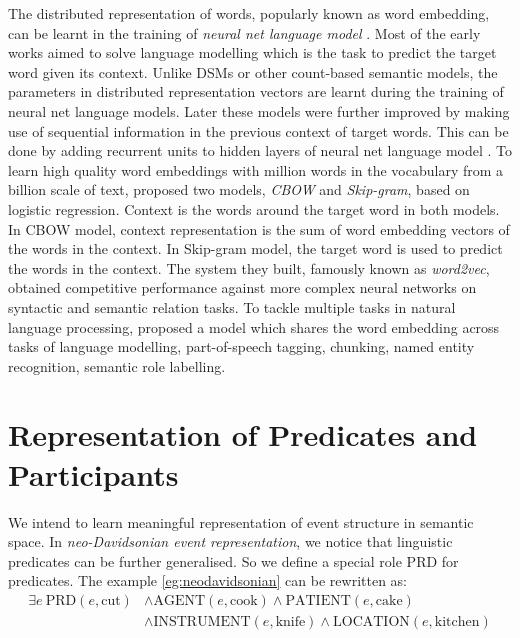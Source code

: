 \documentclass[a4paper]{article}
\begin{document}
The distributed representation of words, popularly known as word embedding, can be learnt in the training of \textit{neural net language model} \citep{bengio2003neural}. Most of the early works aimed to solve language modelling which is the task to predict the target word given its context. Unlike DSMs or other count-based semantic models, the parameters in distributed representation vectors are learnt during the training of neural net language models. Later these models were further improved by making use of sequential information in the previous context of target words. This can be done by adding recurrent units to hidden layers of neural net language model \citep{mikolov2010recurrent}. To learn high quality word embeddings with million words in the vocabulary from a billion scale of text, \citet{mikolov2013efficient} proposed two models, \textit{CBOW} and \textit{Skip-gram}, based on logistic regression. Context is the words around the target word in both models. In CBOW model, context representation is the sum of word embedding vectors of the words in the context. In Skip-gram model, the target word is used to predict the words in the context. The system they built, famously known as \textit{word2vec}, obtained competitive performance against more complex neural networks on syntactic and semantic relation tasks. To tackle multiple tasks in natural language processing, \citet{collobert2011natural} proposed a model which shares the word embedding across tasks of language modelling, part-of-speech tagging, chunking, named entity recognition, semantic role labelling. 



\newpage
\section{Representation of Predicates and Participants}
We intend to learn meaningful representation of event structure in semantic space. In \textit{neo-Davidsonian event representation}, we notice that linguistic predicates can be further generalised. So we define a special role PRD for predicates. The example \ref{eg:neodavidsonian} can be rewritten as: 
\begin{equation*} \label{eg:symbolic-thematic}
\begin{aligned}
    \exists e\ \text{PRD}(e, \text{cut})
    & \land \text{AGENT}(e, \text{cook}) \land \text{PATIENT}(e, \text{cake}) \\
    & \land \text{INSTRUMENT}(e, \text{knife}) \land \text{LOCATION}(e, \text{kitchen}) \\
\end{aligned}
\end{equation*}
\end{document}
